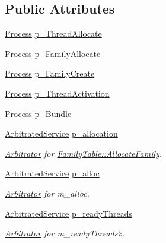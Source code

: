 \subsection*{Public Attributes}
\begin{DoxyCompactItemize}
\item 
\hyperlink{class_simulator_1_1_process}{Process} \hyperlink{class_simulator_1_1drisc_1_1_allocator_a76447246986a86eda057380a359b0a61}{p\+\_\+\+Thread\+Allocate}
\item 
\hyperlink{class_simulator_1_1_process}{Process} \hyperlink{class_simulator_1_1drisc_1_1_allocator_a8b7b38207f6ada3e91ef3b754dde6db5}{p\+\_\+\+Family\+Allocate}
\item 
\hyperlink{class_simulator_1_1_process}{Process} \hyperlink{class_simulator_1_1drisc_1_1_allocator_acd596bc11bab9b44a07e069aea4864a2}{p\+\_\+\+Family\+Create}
\item 
\hyperlink{class_simulator_1_1_process}{Process} \hyperlink{class_simulator_1_1drisc_1_1_allocator_a86ba51d9defcde72c57eb52ebfbb9d1f}{p\+\_\+\+Thread\+Activation}
\item 
\hyperlink{class_simulator_1_1_process}{Process} \hyperlink{class_simulator_1_1drisc_1_1_allocator_ab585d90eae505ff9f0919bb37c1037d4}{p\+\_\+\+Bundle}
\item 
\hyperlink{class_simulator_1_1_arbitrated_service}{Arbitrated\+Service} \hyperlink{class_simulator_1_1drisc_1_1_allocator_aad58ba20aab3c4e2262895c164c6b0a2}{p\+\_\+allocation}
\begin{DoxyCompactList}\small\item\em \hyperlink{class_simulator_1_1_arbitrator}{Arbitrator} for \hyperlink{class_simulator_1_1drisc_1_1_family_table_a79281183526d6db39fab77082005e85e}{Family\+Table\+::\+Allocate\+Family}. \end{DoxyCompactList}\item 
\hyperlink{class_simulator_1_1_arbitrated_service}{Arbitrated\+Service} \hyperlink{class_simulator_1_1drisc_1_1_allocator_a61ddc6b62670962e5bdaabe2b930db43}{p\+\_\+alloc}
\begin{DoxyCompactList}\small\item\em \hyperlink{class_simulator_1_1_arbitrator}{Arbitrator} for m\+\_\+alloc. \end{DoxyCompactList}\item 
\hyperlink{class_simulator_1_1_arbitrated_service}{Arbitrated\+Service} \hyperlink{class_simulator_1_1drisc_1_1_allocator_a90377bbf4176289f5b2a3fbb3f3de5d9}{p\+\_\+ready\+Threads}
\begin{DoxyCompactList}\small\item\em \hyperlink{class_simulator_1_1_arbitrator}{Arbitrator} for m\+\_\+ready\+Threads2. \end{DoxyCompactList}\item 

\end{DoxyCompactItemize}
